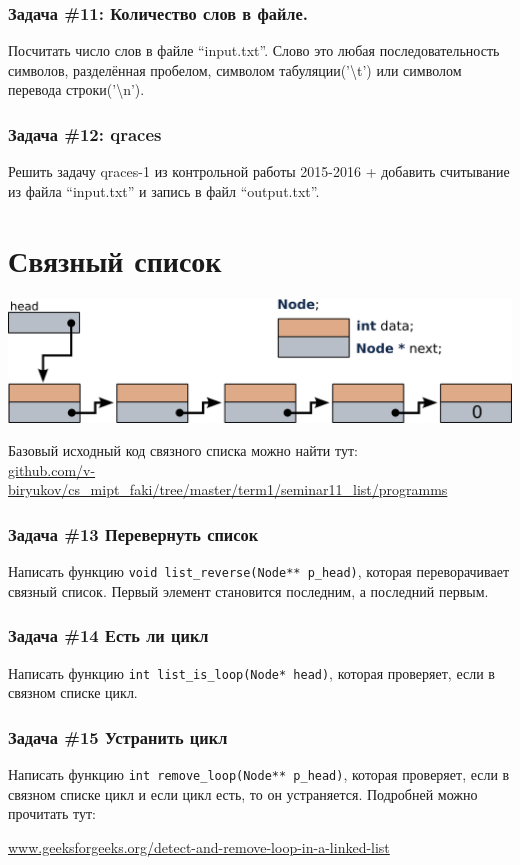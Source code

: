 \documentclass{article}
\begin{document}
\subsubsection*{\Squarepipe \quad Задача \#11: Количество слов в файле.}
Посчитать число слов в файле ``input.txt''. Слово это любая последовательность символов, разделённая пробелом, символом табуляции('\textbackslash t') или символом перевода строки('\textbackslash n').

\subsubsection*{\Bat \quad Задача \#12: qraces}
Решить задачу qraces-1 из контрольной работы 2015-2016 + добавить считывание из файла ``input.txt'' и запись в файл ``output.txt''.

\section*{Связный список}
\begin{center}
\includegraphics[width=0.6\linewidth]{list_initial.png}\\
\end{center}
Базовый исходный код связного списка можно найти тут:\\
\href{https://github.com/v-biryukov/cs_mipt_faki/tree/master/term1/seminar11_list/programms}{github.com/v-biryukov/cs\_mipt\_faki/tree/master/term1/seminar11\_list/programms}

\subsubsection*{\Squarepipe \quad Задача \#13 Перевернуть список}
Написать функцию \texttt{void list\_reverse(Node** p\_head)}, которая переворачивает связный список. Первый элемент становится последним, а последний первым. 

\subsubsection*{\Bat \quad Задача \#14 Есть ли цикл}
Написать функцию \texttt{int list\_is\_loop(Node* head)}, которая проверяет, если в связном списке цикл.

\subsubsection*{\Bat \quad Задача \#15 Устранить цикл}
Написать функцию \texttt{int remove\_loop(Node** p\_head)}, которая проверяет, если в связном списке цикл и если цикл есть, то он устраняется. Подробней можно прочитать тут:

\href{http://www.geeksforgeeks.org/detect-and-remove-loop-in-a-linked-list/}{www.geeksforgeeks.org/detect-and-remove-loop-in-a-linked-list}
\end{document}
